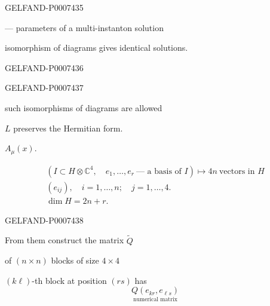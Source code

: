 \begin{GelfandAdjacentEvidence}{GELFAND-P000743}{5}

--- parameters of a multi-instanton solution

isomorphism of diagrams gives identical solutions.

\end{GelfandAdjacentEvidence}
\begin{GelfandAdjacentEvidence}{GELFAND-P000743}{6}

\end{GelfandAdjacentEvidence}
\begin{GelfandAdjacentEvidence}{GELFAND-P000743}{7}


such isomorphisms of diagrams are allowed

\(L\) preserves the Hermitian form.

 \(A_\mu(x)\).

\begin{gather*}
(I\subset H\otimes\mathbb C^4,\quad e_1,\ldots,e_r\ \text{--- a basis of } I)
\longmapsto 4n\ \text{vectors in }H\\
(e_{ij}),\quad i=1,\ldots,n;\quad j=1,\ldots,4.\\
\dim H=2n+r.
\end{gather*}
\end{GelfandAdjacentEvidence}
\begin{GelfandAdjacentEvidence}{GELFAND-P000743}{8}


From them construct the matrix \(\widetilde Q\)

of \((n\times n)\) blocks of size \(4\times4\)

\((k\ell)\)-th block at position \((rs)\) has
\[
\underset{\text{numerical matrix}}{Q(e_{kr},e_{\ell s})}
\]
\end{GelfandAdjacentEvidence}


